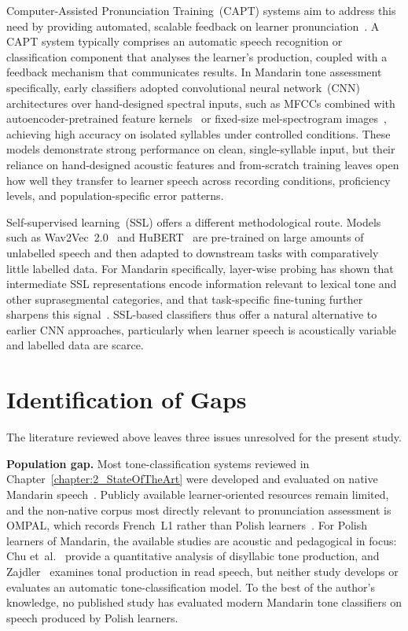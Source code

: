 Computer-Assisted Pronunciation Training~(CAPT) systems aim to address this need by providing automated, scalable feedback on learner pronunciation~\cite{neri2002,rogerson2021}. A CAPT system typically comprises an automatic speech recognition or classification component that analyses the learner's production, coupled with a feedback mechanism that communicates results. In Mandarin tone assessment specifically, early classifiers adopted convolutional neural network~(CNN) architectures over hand-designed spectral inputs, such as MFCCs combined with autoencoder-pretrained feature kernels~\cite{chen2016cnn} or fixed-size mel-spectrogram images~\cite{gao2019tonenet}, achieving high accuracy on isolated syllables under controlled conditions. These models demonstrate strong performance on clean, single-syllable input, but their reliance on hand-designed acoustic features and from-scratch training leaves open how well they transfer to learner speech across recording conditions, proficiency levels, and population-specific error patterns.

Self-supervised learning~(SSL) offers a different methodological route. Models such as Wav2Vec~2.0~\cite{baevski2020} and HuBERT~\cite{hsu2021} are pre-trained on large amounts of unlabelled speech and then adapted to downstream tasks with comparatively little labelled data. For Mandarin specifically, layer-wise probing has shown that intermediate SSL representations encode information relevant to lexical tone and other suprasegmental categories, and that task-specific fine-tuning further sharpens this signal~\cite{yuan2023,delafuente2024}. SSL-based classifiers thus offer a natural alternative to earlier CNN approaches, particularly when learner speech is acoustically variable and labelled data are scarce.

\section{Identification of Gaps}
\label{sec:intro:gaps}

The literature reviewed above leaves three issues unresolved for the present study.

\textbf{Population gap.} Most tone-classification systems reviewed in Chapter~\ref{chapter:2_StateOfTheArt} were developed and evaluated on native Mandarin speech~\cite{chen2016cnn,gao2019tonenet}. Publicly available learner-oriented resources remain limited, and the non-native corpus most directly relevant to pronunciation assessment is OMPAL, which records French~L1 rather than Polish learners~\cite{hsieh2025ompal}. For Polish learners of Mandarin, the available studies are acoustic and pedagogical in focus: Chu et~al.~\cite{chu2024statistical} provide a quantitative analysis of disyllabic tone production, and Zajdler~\cite{zajdler2021} examines tonal production in read speech, but neither study develops or evaluates an automatic tone-classification model. To the best of the author's knowledge, no published study has evaluated modern Mandarin tone classifiers on speech produced by Polish learners.

